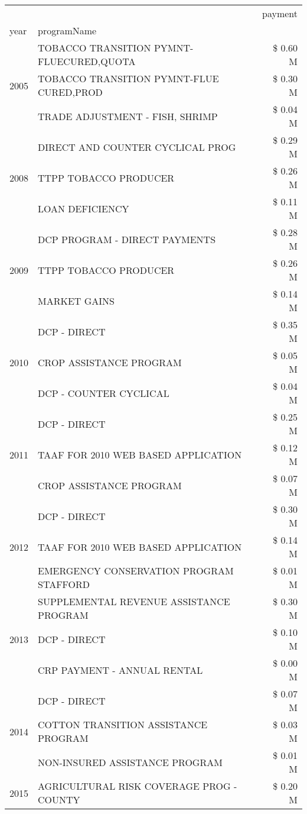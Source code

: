 \begin{tabular}{llr}
\toprule
 &  & payment \\
year & programName &  \\
\midrule
\multirow[t]{3}{*}{2005} & TOBACCO TRANSITION PYMNT-FLUECURED,QUOTA & \$ 0.60 M \\
 & TOBACCO TRANSITION PYMNT-FLUE CURED,PROD & \$ 0.30 M \\
 & TRADE ADJUSTMENT - FISH, SHRIMP & \$ 0.04 M \\
\cline{1-3}
\multirow[t]{3}{*}{2008} & DIRECT AND COUNTER CYCLICAL PROG & \$ 0.29 M \\
 & TTPP TOBACCO PRODUCER & \$ 0.26 M \\
 & LOAN DEFICIENCY & \$ 0.11 M \\
\cline{1-3}
\multirow[t]{3}{*}{2009} & DCP PROGRAM - DIRECT PAYMENTS & \$ 0.28 M \\
 & TTPP TOBACCO PRODUCER & \$ 0.26 M \\
 & MARKET GAINS & \$ 0.14 M \\
\cline{1-3}
\multirow[t]{3}{*}{2010} & DCP - DIRECT & \$ 0.35 M \\
 & CROP ASSISTANCE PROGRAM & \$ 0.05 M \\
 & DCP - COUNTER CYCLICAL & \$ 0.04 M \\
\cline{1-3}
\multirow[t]{3}{*}{2011} & DCP - DIRECT & \$ 0.25 M \\
 & TAAF FOR 2010 WEB BASED APPLICATION & \$ 0.12 M \\
 & CROP ASSISTANCE PROGRAM & \$ 0.07 M \\
\cline{1-3}
\multirow[t]{3}{*}{2012} & DCP - DIRECT & \$ 0.30 M \\
 & TAAF FOR 2010 WEB BASED APPLICATION & \$ 0.14 M \\
 & EMERGENCY CONSERVATION PROGRAM STAFFORD & \$ 0.01 M \\
\cline{1-3}
\multirow[t]{3}{*}{2013} & SUPPLEMENTAL REVENUE ASSISTANCE PROGRAM & \$ 0.30 M \\
 & DCP - DIRECT & \$ 0.10 M \\
 & CRP PAYMENT - ANNUAL RENTAL & \$ 0.00 M \\
\cline{1-3}
\multirow[t]{3}{*}{2014} & DCP - DIRECT & \$ 0.07 M \\
 & COTTON TRANSITION ASSISTANCE PROGRAM & \$ 0.03 M \\
 & NON-INSURED ASSISTANCE PROGRAM & \$ 0.01 M \\
\cline{1-3}
\multirow[t]{3}{*}{2015} & AGRICULTURAL RISK COVERAGE PROG - COUNTY & \$ 0.20 M \\

\end{tabular}
